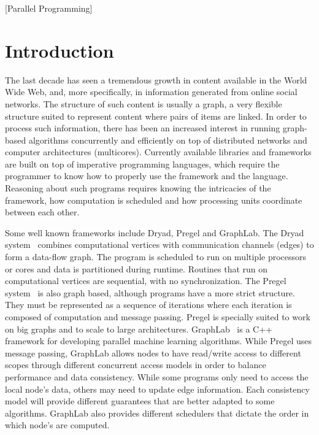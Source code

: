 \documentclass{sigplanconf}
\begin{document}
[Parallel Programming]


 
\makeatletter{}\section{Introduction}

The last decade has seen a tremendous growth in content available in
the World Wide Web, and, more specifically, in information generated
from online social networks. The structure of such content is usually
a graph, a very flexible structure suited to represent content where
pairs of items are linked.  In order to process such information,
there has been an increased interest in running graph-based algorithms
concurrently and efficiently on top of distributed networks and
computer architectures (multicores).  Currently available libraries
and frameworks are built on top of imperative programming languages,
which require the programmer to know how to properly use the framework
and the language. Reasoning about such programs requires knowing the
intricacies of the framework, how computation is scheduled and how
processing units coordinate between each other.

Some well known frameworks include Dryad, Pregel and GraphLab.  The
Dryad system~\cite{Isard:2007:DDD:1272996.1273005} combines
computational vertices with communication channels (edges) to form a
data-flow graph. The program is scheduled to run on multiple
processors or cores and data is partitioned during runtime. Routines
that run on computational vertices are sequential, with no
synchronization.  The Pregel
system~\cite{Malewicz:2010:PSL:1807167.1807184} is also graph based,
although programs have a more strict structure. They must be
represented as a sequence of iterations where each iteration is
composed of computation and message passing.  Pregel is specially
suited to work on big graphs and to scale to large architectures.
GraphLab~\cite{GraphLab2010} is a C++ framework for developing
parallel machine learning algorithms. While Pregel uses message
passing, GraphLab allows nodes to have read/write access to different
scopes through different concurrent access models in order to balance
performance and data consistency. While some programs only need to
access the local node's data, others may need to update edge
information. Each consistency model will provide different guarantees
that are better adapted to some algorithms. GraphLab also provides
different schedulers that dictate the order in which node's are
computed.
\end{document}
